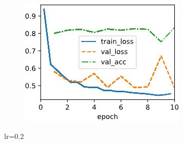 \documentclass{article}
\begin{document}
\begin{figure}[ht]
\begin{center}
\begin{subfigure}[b]{0.3\columnwidth}
      \includegraphics[width=\columnwidth]{img/lr0.2 cosine0.01.jpg}
   \end{subfigure}
\caption{lr=0.2}
\label{lr:0.2}
\end{center}
\end{figure}
\end{document}
